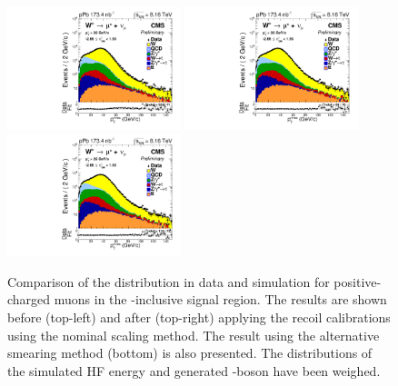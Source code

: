 \begin{figure}[htb!]
 \centering
 \includegraphics[width=0.45\textwidth]{Figures/WBoson/Analysis/Correction/Recoil/CheckFits/W/METPF_RAW_HFBosonPTrew/PLOT_MET_DATA_WToMuPl_PA_Model_TEMP_WDYDYToTauWToTauTTbar_ModifiedRayleigh_QCD_MuEtaCM_-286_193_MuIso_0_15.pdf}
 \includegraphics[width=0.45\textwidth]{Figures/WBoson/Analysis/Correction/Recoil/CheckFits/W/Recoil_ScalingGauss/PLOT_MET_DATA_WToMuPl_PA_Model_TEMP_WDYDYToTauWToTauTTbar_ModifiedRayleigh_QCD_MuEtaCM_-286_193_MuIso_0_15.pdf}
 \includegraphics[width=0.45\textwidth]{Figures/WBoson/Analysis/Correction/Recoil/CheckFits/W/Recoil_Smearing/PLOT_MET_DATA_WToMuPl_PA_Model_TEMP_WDYDYToTauWToTauTTbar_ModifiedRayleigh_QCD_MuEtaCM_-286_193_MuIso_0_15.pdf}
 \caption{Comparison of the \ptmiss distribution in data and simulation for positive-charged muons in the  \etaMuCM-inclusive signal region. The results are shown before (top-left) and after (top-right) applying the recoil calibrations using the nominal scaling method. The result using the alternative smearing method (bottom) is also presented. The distributions of the simulated HF energy and generated \Z-boson \pt have been weighed.}
 \label{fig:recoilCorrWreg}
\end{figure}


